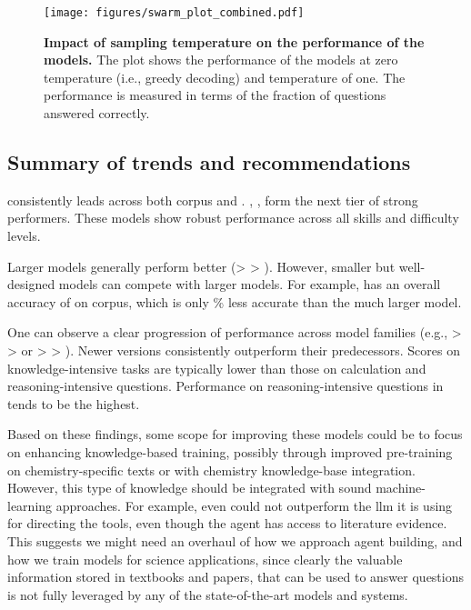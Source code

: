 \begin{figure}[!h]
    \centering
    \texttt{[image: figures/swarm\_plot\_combined.pdf]}
    \caption{\textbf{Impact of sampling temperature on the performance of the models.} The plot shows the performance of the models at zero temperature (i.e., greedy decoding) and temperature of one. The performance is measured in terms of the fraction of questions answered correctly.}
    \label{fig:temperature_impact}
\end{figure}


\clearpage
\subsection{Summary of trends and recommendations}

\oone consistently leads across both \ChemBench corpus and \chembenchmini.  \ClaudeThreeFiveSonnet, \GPTFourO, \LlamaThreeOneFourZeroFiveBInstruct form the next tier of strong performers. These models show robust performance across all skills and difficulty levels. 

Larger models generally perform better (\LlamaThreeOneFourZeroFiveBInstruct > \LlamaThreeOneSeventyBInstruct > \LlamaThreeOneEightBInstruct). However, smaller but well-designed models can compete with larger models. For example, \GemmaTwoNineBIt has an overall accuracy of  on \ChemBench corpus, which is only \% less accurate than the much larger \LlamaThreeOneFourZeroFiveBInstruct model.

One can observe a clear progression of performance across model families (e.g., \ClaudeThreeFiveSonnet >  \ClaudeThree > \ClaudeTwo or \GPTFourO > \GPTFour > \GPTThreeFiveTurboZeroT). Newer versions consistently outperform their predecessors.
Scores on knowledge-intensive tasks are typically lower than those on calculation and reasoning-intensive questions. Performance on reasoning-intensive questions in \chembench tends to be the highest.

Based on these findings, some scope for improving these models could be to focus on enhancing knowledge-based training, possibly through improved pre-training on chemistry-specific texts or with chemistry knowledge-base integration. However, this type of knowledge should be integrated with sound machine-learning approaches. For example, even \PaperQATwo could not outperform the \gls{llm} it is using for directing the tools, even though the agent has access to literature evidence. This suggests we might need an overhaul of how we approach agent building, and how we train models for science applications, since clearly the valuable information stored in textbooks and papers, that can be used to answer questions is not fully leveraged by any of the state-of-the-art models and systems.


